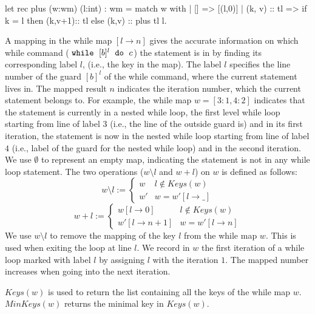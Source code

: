 \documentclass[a4paper,11pt]{article}
\begin{document}
{\begin{defn}
\begin{ocaml}{}
	let rec plus (w:wm) (l:int) : wm = 
	    match w with 
	       | [] => [(l,0)]
	       | (k, v) :: tl => 
	        if k = l then (k,v+1):: tl else (k,v) :: plus tl l.         
	\end{ocaml}
  	\end{defn}
  	A mapping in the while map $[l \to n]$ gives the accurate information on which while command 
  	($\;\mathtt{while}\; ~ [b]^l ~ \;\mathtt{do}\; ~ c $) the statement is in by finding its corresponding label $l$, 
  	(i.e., the key in the map). 
  	The label $l$ specifies the line number of the guard $[b]^l$ of the while command, where the current statement lives in. 
  	The mapped result $n$ indicates the iteration number, which the current statement belongs to. 
  	For example, the while map $w=[3:1, 4:2]$ indicates that the statement is currently in a nested while loop, the first level while loop starting from line of label $3$ (i.e., the line of the outside guard is) 
  	and in its first iteration, 
  	the statement is now in the nested while loop starting from line of label $4$ (i.e., label of the guard for the nested while loop) 
  	and in the second iteration. 
  	We use $\emptyset$ to represent an empty map, indicating the statement is not in any while loop statement. 
  	The two operations ($w \setminus l$ and $w + l$) 
  	on $w$ is defined as follows:
	\begin{equation}
		w \setminus l  := \left\{
		\begin{array}{cl} 
			 w  & l \not\in Keys(w)   \\
			 w' & w = w' [l \to \_] 
		\end{array}
		\right.
	\end{equation}
	\begin{equation}
		w + l  :=  \left\{
		\begin{array}{cl} 
		 	w[l \to 0] & l \not \in Keys(w) \\   
		    w'[l \to n+1] &  w = w'[l \to n]
		\end{array}
		\right.
	\end{equation}
%
We use $w \setminus l$ to remove the mapping of the key $l$ from the while map $w$. 
This is used when exiting the loop at line $l$.  
We record in $w$ the first iteration of a while loop marked with label $l$ by assigning $l$ with the iteration $1$. 
The mapped number increases when going into the next iteration. 

$Keys(w)$ is used to return the list containing all the keys of the while map $w$. $MinKeys(w)$ returns the minimal key in $Keys(w)$.
}
\end{document}
